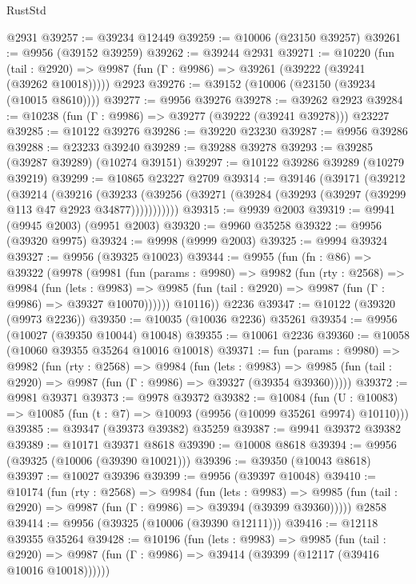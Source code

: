 \begin{lexlean}{RustStd}
\begin{coremodule}
    @2931
@39257 := @39234 @12449
@39259 := @10006 (@23150 @39257)
@39261 := @9956 (@39152 @39259)
@39262 := @39244 @2931
@39271 := @10220
    (fun (tail : @2920) => @9987 (fun (Γ : @9986) => @39261 (@39222 (@39241 (@39262 @10018)))))
    @2923
@39276 := @39152 (@10006 (@23150 (@39234 (@10015 @8610))))
@39277 := @9956 @39276
@39278 := @39262 @2923
@39284 := @10238 (fun (Γ : @9986) => @39277 (@39222 (@39241 @39278))) @23227
@39285 := @10122 @39276
@39286 := @39220 @23230
@39287 := @9956 @39286
@39288 := @23233 @39240
@39289 := @39288 @39278
@39293 := @39285 (@39287 @39289) (@10274 @39151)
@39297 := @10122 @39286 @39289 (@10279 @39219)
@39299 := @10865 @23227 @2709
@39314 := @39146
    (@39171
      (@39212
        (@39214
          (@39216
            (@39233 (@39256 (@39271 (@39284 (@39293 (@39297 (@39299 @113 @47 @2923 @34877)))))))))))
@39315 := @9939 @2003
@39319 := @9941 (@9945 @2003) (@9951 @2003)
@39320 := @9960 @35258
@39322 := @9956 (@39320 @9975)
@39324 := @9998 (@9999 @2003)
@39325 := @9994 @39324
@39327 := @9956 (@39325 @10023)
@39344 := @9955
    (fun (fn : @86) =>
    @39322
      (@9978
        (@9981
          (fun (params : @9980) =>
          @9982
            (fun (rty : @2568) =>
            @9984
              (fun (lets : @9983) =>
              @9985 (fun (tail : @2920) => @9987 (fun (Γ : @9986) => @39327 @10070))))))
        @10116))
    @2236
@39347 := @10122 (@39320 (@9973 @2236))
@39350 := @10035 (@10036 @2236) @35261
@39354 := @9956 (@10027 (@39350 @10044) @10048)
@39355 := @10061 @2236
@39360 := @10058 (@10060 @39355 @35264 @10016 @10018)
@39371 := fun (params : @9980) =>
  @9982
    (fun (rty : @2568) =>
    @9984
      (fun (lets : @9983) =>
      @9985 (fun (tail : @2920) => @9987 (fun (Γ : @9986) => @39327 (@39354 @39360)))))
@39372 := @9981 @39371
@39373 := @9978 @39372
@39382 := @10084
    (fun (U : @10083) => @10085 (fun (t : @7) => @10093 (@9956 (@10099 @35261 @9974) @10110)))
@39385 := @39347 (@39373 @39382) @35259
@39387 := @9941 @39372 @39382
@39389 := @10171 @39371 @8618
@39390 := @10008 @8618
@39394 := @9956 (@39325 (@10006 (@39390 @10021)))
@39396 := @39350 (@10043 @8618)
@39397 := @10027 @39396
@39399 := @9956 (@39397 @10048)
@39410 := @10174
    (fun (rty : @2568) =>
    @9984
      (fun (lets : @9983) =>
      @9985 (fun (tail : @2920) => @9987 (fun (Γ : @9986) => @39394 (@39399 @39360)))))
    @2858
@39414 := @9956 (@39325 (@10006 (@39390 @12111)))
@39416 := @12118 @39355 @35264
@39428 := @10196
    (fun (lets : @9983) =>
    @9985
      (fun (tail : @2920) =>
      @9987 (fun (Γ : @9986) => @39414 (@39399 (@12117 (@39416 @10016 @10018))))))

\end{coremodule}
\end{lexlean}
